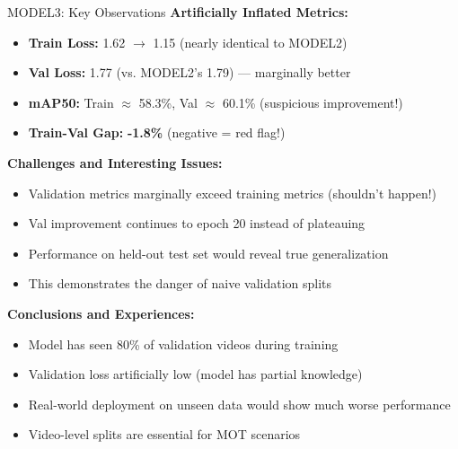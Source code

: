 \documentclass{beamer}
\begin{document}
\begin{frame}{MODEL3: Key Observations}
    \textbf{Artificially Inflated Metrics:}
    \begin{itemize}
        \item \textbf{Train Loss:} 1.62 $\rightarrow$ 1.15 (nearly identical to MODEL2)
        \item \textbf{Val Loss:} 1.77 (vs. MODEL2's 1.79) — marginally better
        \item \textbf{mAP50:} Train $\approx$ 58.3\%, Val $\approx$ 60.1\% (suspicious improvement!)
        \item \textbf{Train-Val Gap:} \textbf{-1.8\%} (negative = red flag!)
    \end{itemize}

    \vspace{0.3cm}
    \textbf{Challenges and Interesting Issues:}
    \begin{itemize}
        \item Validation metrics marginally exceed training metrics (shouldn't happen!)
        \item Val improvement continues to epoch 20 instead of plateauing
        \item Performance on held-out test set would reveal true generalization
        \item This demonstrates the danger of naive validation splits
    \end{itemize}

    \vspace{0.3cm}
    \textbf{Conclusions and Experiences:}
    \begin{itemize}
        \item Model has seen 80\% of validation videos during training
        \item Validation loss artificially low (model has partial knowledge)
        \item Real-world deployment on unseen data would show much worse performance
        \item Video-level splits are essential for MOT scenarios
    \end{itemize}
\end{frame}
\end{document}
